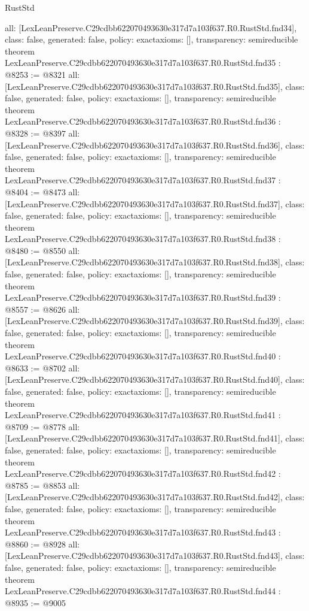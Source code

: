 \begin{lexlean}{RustStd}
\begin{coremodule}
{  all: [LexLeanPreserve.C29cdbb622070493630e317d7a103f637.R0.RustStd.fnd34],
  class: false,
  generated: false,
  policy: exact{axioms: []},
  transparency: semireducible
}
theorem LexLeanPreserve.C29cdbb622070493630e317d7a103f637.R0.RustStd.fnd35 : @8253 := @8321 {
  all: [LexLeanPreserve.C29cdbb622070493630e317d7a103f637.R0.RustStd.fnd35],
  class: false,
  generated: false,
  policy: exact{axioms: []},
  transparency: semireducible
}
theorem LexLeanPreserve.C29cdbb622070493630e317d7a103f637.R0.RustStd.fnd36 : @8328 := @8397 {
  all: [LexLeanPreserve.C29cdbb622070493630e317d7a103f637.R0.RustStd.fnd36],
  class: false,
  generated: false,
  policy: exact{axioms: []},
  transparency: semireducible
}
theorem LexLeanPreserve.C29cdbb622070493630e317d7a103f637.R0.RustStd.fnd37 : @8404 := @8473 {
  all: [LexLeanPreserve.C29cdbb622070493630e317d7a103f637.R0.RustStd.fnd37],
  class: false,
  generated: false,
  policy: exact{axioms: []},
  transparency: semireducible
}
theorem LexLeanPreserve.C29cdbb622070493630e317d7a103f637.R0.RustStd.fnd38 : @8480 := @8550 {
  all: [LexLeanPreserve.C29cdbb622070493630e317d7a103f637.R0.RustStd.fnd38],
  class: false,
  generated: false,
  policy: exact{axioms: []},
  transparency: semireducible
}
theorem LexLeanPreserve.C29cdbb622070493630e317d7a103f637.R0.RustStd.fnd39 : @8557 := @8626 {
  all: [LexLeanPreserve.C29cdbb622070493630e317d7a103f637.R0.RustStd.fnd39],
  class: false,
  generated: false,
  policy: exact{axioms: []},
  transparency: semireducible
}
theorem LexLeanPreserve.C29cdbb622070493630e317d7a103f637.R0.RustStd.fnd40 : @8633 := @8702 {
  all: [LexLeanPreserve.C29cdbb622070493630e317d7a103f637.R0.RustStd.fnd40],
  class: false,
  generated: false,
  policy: exact{axioms: []},
  transparency: semireducible
}
theorem LexLeanPreserve.C29cdbb622070493630e317d7a103f637.R0.RustStd.fnd41 : @8709 := @8778 {
  all: [LexLeanPreserve.C29cdbb622070493630e317d7a103f637.R0.RustStd.fnd41],
  class: false,
  generated: false,
  policy: exact{axioms: []},
  transparency: semireducible
}
theorem LexLeanPreserve.C29cdbb622070493630e317d7a103f637.R0.RustStd.fnd42 : @8785 := @8853 {
  all: [LexLeanPreserve.C29cdbb622070493630e317d7a103f637.R0.RustStd.fnd42],
  class: false,
  generated: false,
  policy: exact{axioms: []},
  transparency: semireducible
}
theorem LexLeanPreserve.C29cdbb622070493630e317d7a103f637.R0.RustStd.fnd43 : @8860 := @8928 {
  all: [LexLeanPreserve.C29cdbb622070493630e317d7a103f637.R0.RustStd.fnd43],
  class: false,
  generated: false,
  policy: exact{axioms: []},
  transparency: semireducible
}
theorem LexLeanPreserve.C29cdbb622070493630e317d7a103f637.R0.RustStd.fnd44 : @8935 := @9005 {
}
\end{coremodule}
\end{lexlean}
